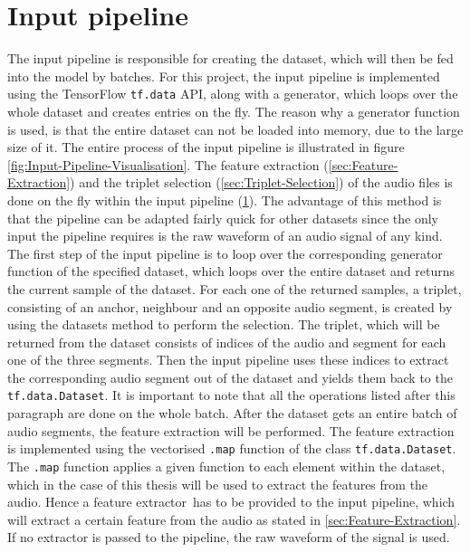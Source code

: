 \section{Input pipeline}
\label{sec:Input-Pipeline}
The input pipeline is responsible for creating the dataset, which will then be fed into the model by batches. For this project, the input pipeline is implemented using the TensorFlow \texttt{tf.data} API\footnotemark, along with a generator, which loops over the whole dataset and creates entries on the fly. The reason why a generator function is used, is that the entire dataset can not be loaded into memory, due to the large size of it. The entire process of the input pipeline is illustrated in figure \ref{fig:Input-Pipeline-Visualisation}.
\newline
\newline
The feature extraction (\ref{sec:Feature-Extraction}) and the triplet selection (\ref{sec:Triplet-Selection}) of the audio files is done on the fly within the input pipeline (\ref{sec:Input-Pipeline}). The advantage of this method is that the pipeline can be adapted fairly quick for other datasets since the only input the pipeline requires is the raw waveform of an audio signal of any kind. 
\newline
\newline
The first step of the input pipeline is to loop over the corresponding generator function of the specified dataset, which loops over the entire dataset and returns the current sample of the dataset. For each one of the returned samples, a triplet, consisting of an anchor, neighbour and an opposite audio segment, is created by using the datasets method to perform the selection. The triplet, which will be returned from the dataset consists of indices of the audio and segment for each one of the three segments. Then the input pipeline uses these indices to extract the corresponding audio segment out of the dataset and yields them back to the \texttt{tf.data.Dataset}. It is important to note that all the operations listed after this paragraph are done on the whole batch.
\newline
\newline
After the dataset gets an entire batch of audio segments, the feature extraction will be performed. The feature extraction is implemented using the vectorised \texttt{.map} function of the class \texttt{tf.data.Dataset}\footnotemark. The \texttt{.map} function applies a given function to each element within the dataset, which in the case of this thesis will be used to extract the features from the audio. Hence a \flqq feature extractor\frqq \ has to be provided to the input pipeline, which will extract a certain feature from the audio as stated in \ref{sec:Feature-Extraction}. If no extractor is passed to the pipeline, the raw waveform of the signal is used. 
